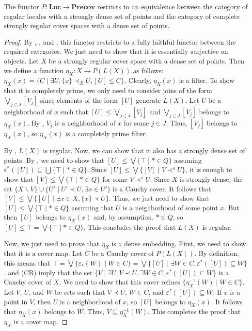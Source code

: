 \documentclass[reqno]{amsart}
\newcommand{\axref}[1]{(\hyperref[ax:#1]{#1})}
\theoremstyle{definition}
\theoremstyle{remark}
\numberwithin{figure}{section}
\newcommand{\rb}{\prec}
\newcommand{\cat}[1]{\mathbf{#1}}
\begin{document}
\begin{thm}
The functor $P : \cat{Loc} \to \cat{Precov}$ restricts to an equivalence between the category of regular locales with a strongly dense set of points and the category of complete strongly regular cover spaces with a dense set of points.
\end{thm}
\begin{proof}
By , , and , this functor restricts to a fully faithful functor between the required categories.
We just need to show that it is essentially surjective on objects.
Let $X$ be a strongly regular cover space with a dense set of points.
Then we define a function $\eta_X : X \to P(L(X))$ as follows: $\eta_X(x) = \{ C \mid \exists U, \{ x \} \rb_X U, [U] \leq C \}$.
Clearly, $\eta_X(x)$ is a filter.
To show that it is completely prime, we only need to consider joins of the form $\bigvee_{j \in J} [V_j]$ since elements of the form $[U]$ generate $L(X)$.
Let $U$ be a neighborhood of $x$ such that $[U] \leq \bigvee_{j \in J} [V_j]$ and $\bigvee_{j \in J} [V_j]$ belongs to $\eta_X(x)$.
By , $V_j$ is a neighborhood of $x$ for some $j \in J$.
Thus, $[V_j]$ belongs to $\eta_X(x)$, so $\eta_X(x)$ is a completely prime filter.

By , $L(X)$ is regular.
Now, we can show that it also has a strongly dense set of points.
By , we need to show that $[U] \leq \bigvee \{ \top \mid * \in Q \}$ assuming $\varepsilon^*([U]) \subseteq \bigcup \{ \top \mid * \in Q \}$.
Since $[U] \leq \bigvee \{ [V] \mid V \rb^s U \}$, it is enough to show that $[V] \leq \bigvee \{ \top \mid * \in Q \}$ for some $V \rb^s U$.
Since $X$ is strongly dense, the set $\{ X \backslash V \} \cup \{ U' \mid U' \rb U, \exists x \in U' \}$ is a Cauchy cover.
It follows that $[V] \leq \bigvee \{ [U] \mid \exists x \in X, \{ x \} \rb U \}$.
Thus, we just need to show that $[U] \leq \bigvee \{ \top \mid * \in Q \}$ assuming that $U$ is a neighborhood of some point $x$.
But then $[U]$ belongs to $\eta_X(x)$ and, by assumption, $* \in Q$, so $[U] \leq \top = \bigvee \{ \top \mid * \in Q \}$.
This concludes the proof that $L(X)$ is regular.

Now, we just need to prove that $\eta_X$ is a dense embedding.
First, we need to show that it is a cover map.
Let $C$ be a Cauchy cover of $P(L(X))$.
By definition, this means that $\top = \bigvee \{ \varepsilon_*(W) \mid W \in C \} = \bigvee \{ [U] \mid \exists W \in C, \varepsilon^*([U]) \subseteq W \}$.
 and \axref{CR} imply that the set $\{ V \mid \exists U, V \rb U, \exists W \in C, \varepsilon^*([U]) \subseteq W \}$ is a Cauchy cover of $X$.
We need to show that this cover refines $\{ \eta_X^{-1}(W) \mid W \in C \}$.
Let $V$, $U$, and $W$ be sets such that $V \rb U$, $W \in C$, and $\varepsilon^*([U]) \subseteq W$.
If $x$ is a point in $V$, then $U$ is a neighborhood of $x$, so $[U]$ belongs to $\eta_X(x)$.
It follows that $\eta_X(x)$ belongs to $W$.
Thus, $V \subseteq \eta_X^{-1}(W)$.
This completes the proof that $\eta_X$ is a cover map.


\end{proof}
\end{document}
